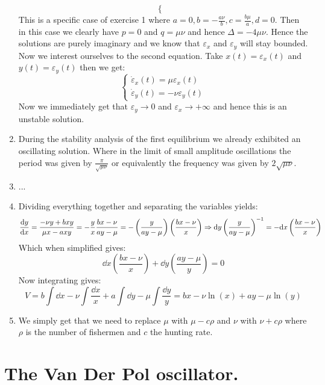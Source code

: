 \documentclass[10pt,a4paper]{book}
\begin{document}
\begin{enumerate}
\[\begin{cases}
\end{cases}
\]
This is a specific case of exercise 1 where $a = 0, b = -\frac{a \nu}{b}, c = \frac{b\mu}{a}, d = 0$. Then in this case we clearly have $p = 0$ and $q = \mu \nu$ and hence $\Delta = - 4 \mu \nu$. Hence the solutions are purely imaginary and we know that $\varepsilon_x$ and $\varepsilon_y$ will stay bounded. \\
Now we interest ourselves to the second equation. Take $x(t) = \varepsilon_x(t)$ and $y(t) = \varepsilon_y(t)$ then we get:
\[
\begin{cases}
\dot{\varepsilon}_x(t) = \mu \varepsilon_x(t)\\
\dot{\varepsilon}_y(t) = - \nu \varepsilon_y(t)
\end{cases}
\]
Now we immediately get that $\varepsilon_y \to 0$ and $\varepsilon_x \to +\infty$ and hence this is an unstable solution.

\item During the stability analysis of the first equilibrium we already exhibited an oscillating solution. Where in the limit of small amplitude oscillations the period was given by $\frac{\pi}{\sqrt{\mu \nu}}$ or equivalently the frequency was given by $2 \sqrt{\mu \nu}$. 

\item ...

\item Dividing everything together and separating the variables yields:
\[
\dv{y}{x} = \frac{-\nu y + b x y}{\mu x - a x y} = -\frac{y}{x} \frac{b x - \nu}{a y - \mu} = - \left(\frac{y}{ay  - \mu} \right)\left(\frac{bx - \nu}{x}\right) \Rightarrow \dd y \left(\frac{y}{ay - \mu}\right)^{-1} = - \dd x \left(\frac{bx - \nu}{x}\right)
\]
Which when simplified gives:
\[
\dd x \left(\frac{b x - \nu}{x}\right)  + \dd y \left(\frac{a y - \mu}{y}\right) = 0
\]
Now integrating gives:
\[
V = b \int \dd x - \nu \int \frac{\dd x}{x} + a \int \dd y - \mu \int \frac{\dd y}{y} = b x - \nu \ln(x) + a y - \mu \ln(y) 
\]

\item We simply get that we need to replace $\mu$ with $\mu - c \rho$ and $\nu$ with $\nu + c \rho$ where $\rho$ is the number of fishermen and $c$ the hunting rate. 

\end{enumerate}

\section{The Van Der Pol oscillator.}
\end{document}
